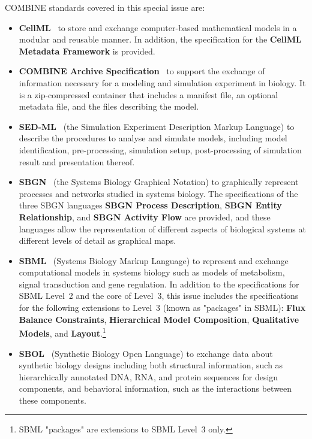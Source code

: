 \documentclass{jib}
\begin{document}
COMBINE standards covered in this special issue are:
\begin{itemize}
\item {\bf CellML}~\cite{cuellar2003overview} to store and exchange computer-based mathematical models in a modular and reusable manner. 
In addition, the specification for the {\bf CellML Metadata Framework} is provided.

\item {\bf COMBINE Archive Specification}~\cite{Bergmann2014combine} to support the exchange of information necessary for a modeling and simulation experiment in biology. 
It is a zip-compressed container that includes a manifest file, an optional metadata file, and the files describing the model. 

\item {\bf SED-ML}~\cite{sedml2011} (the Simulation Experiment Description Markup Language) to describe the procedures to analyse and simulate  models, including model identification, pre-processing, simulation setup, post-processing of simulation result and presentation thereof.

\item {\bf SBGN}~\cite{le2009systems} (the Systems Biology Graphical Notation) to graphically represent processes and networks studied in systems biology. 
The specifications of the three SBGN languages {\bf SBGN Process Description}, {\bf SBGN Entity Relationship}, and {\bf SBGN Activity Flow} are provided, and these languages allow the representation of different aspects of biological systems at different levels of detail as  graphical maps.

\item {\bf SBML}~\cite{hucka2003} (Systems Biology Markup Language) to represent and exchange computational models in systems biology such as models of metabolism, signal transduction and gene regulation.  In addition to the specifications for SBML Level~2 and the core of Level~3, this issue includes the specifications for the following extensions to Level~3 (known as "packages" in SBML): {\bf Flux Balance Constraints}, {\bf Hierarchical Model Composition}, {\bf Qualitative Models}, and {\bf Layout}.\footnote{SBML "packages" are extensions to SBML Level~3 only.}

\item {\bf SBOL}~\cite{galdzicki2014} (Synthetic Biology Open Language) to exchange data about synthetic biology designs including both structural information, such as hierarchically annotated DNA, RNA, and protein sequences for design components, and behavioral information, such as the interactions between these components. 
\end{itemize}
\end{document}
